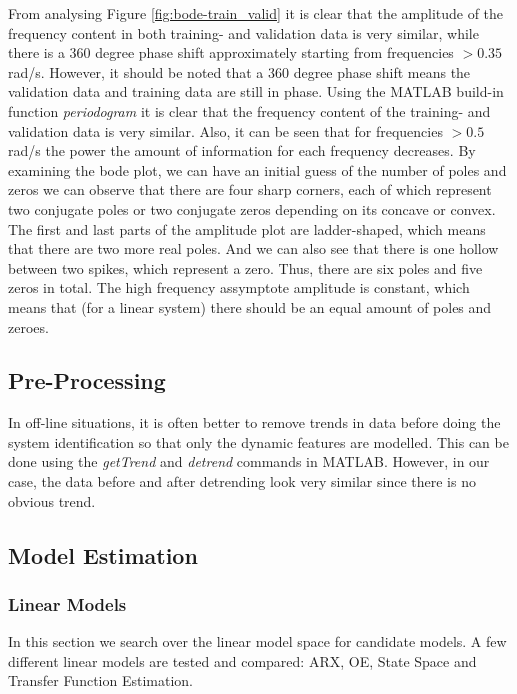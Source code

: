 \documentclass[]{article}
\begin{document}
From analysing Figure \ref{fig:bode-train_valid} it is clear that the amplitude of the frequency content in both training- and validation data is very similar, while there is a 360 degree phase shift approximately starting from frequencies $>0.35$ rad/s. However, it should be noted that a 360 degree phase shift means the validation data and training data are still in phase. Using the MATLAB build-in function \emph{periodogram} it is clear that the frequency content of the training- and validation data is very similar. Also, it can be seen that for frequencies $> 0.5$ rad/s the power the amount of information for each frequency decreases. By examining the bode plot, we can have an initial guess of the number of poles and zeros we can observe that there are four sharp corners, each of which represent two conjugate poles or two conjugate zeros depending on its concave or convex. The first and last parts of the amplitude plot are ladder-shaped, which means that there are two more real poles. And we can also see that there is one hollow between two spikes, which represent a zero. Thus, there are six poles and five zeros in total. The high frequency assymptote amplitude is constant, which means that (for a linear system) there should be an equal amount of poles and zeroes.

\subsection{Pre-Processing}
In off-line situations, it is often better to remove trends in data before doing the system identification so that only the dynamic features are modelled. This can be done using the \textit{getTrend} and \textit{detrend} commands in MATLAB. However, in our case, the data before and after detrending look very similar since there is no obvious trend.

\subsection{Model Estimation}
\subsubsection{Linear Models}
 In this section we search over the linear model space for candidate models. A few different linear models are tested and compared: ARX, OE, State Space and Transfer Function Estimation. 
\end{document}
